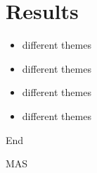 \documentclass[serif, aspectratio=169]{beamer}
\begin{document}
\section{Results}
\begin{frame}
    \begin{itemize}
        \item different themes
        \item different themes
        \item different themes
        \item different themes
    \end{itemize}
\end{frame}


\begin{frame}
    \begin{center}
        {End}
        \vspace{1cm}

        MAS\\[1em]
    \end{center}
\end{frame}
\end{document}
